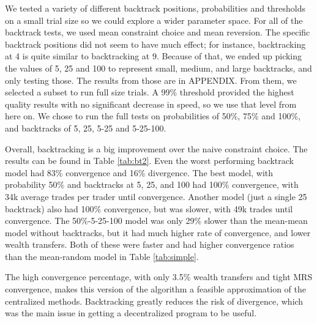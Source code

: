 \documentclass[12pt,a4paper,titlepage]{article}
\begin{document}
We tested a variety of different backtrack positions, probabilities and thresholds on a small trial size so we could explore a wider parameter space.
For all of the backtrack tests, we used mean constraint choice and mean reversion.
The specific backtrack positions did not seem to have much effect; for instance, backtracking at 4 is quite similar to backtracking at 9. 
Because of that, we ended up picking the values of 5, 25 and 100 to represent small, medium, and large backtracks, and only testing those.
The results from those are in APPENDIX.
From them, we selected a subset to run full size trials.
A 99\% threshold provided the highest quality results with no significant decrease in speed, so we use that level from here on.
We chose to run the full tests on probabilities of 50\%, 75\% and 100\%, and backtracks of 5, 25, 5-25 and 5-25-100. 

Overall, backtracking is a big improvement over the naive constraint choice.
The results can be found in Table \ref{tab:bt2}.
Even the worst performing backtrack model had 83\% convergence and 16\% divergence.
The best model, with probability 50\% and backtracks at 5, 25, and 100 had 100\% convergence, with 34k average trades per trader until convergence.
Another model (just a single 25 backtrack) also had 100\% convergence, but was slower, with 49k trades until convergence.
The 50\%-5-25-100 model was only 29\% slower than the mean-mean model without backtracks, but it had much higher rate of convergence, and lower wealth transfers.
Both of these were faster and had higher convergence ratios than the mean-random model in Table \ref{tab:simple}.

The high convergence percentage, with only 3.5\% wealth transfers and tight MRS convergence, makes this version of the algorithm a feasible approximation of the centralized methods. 
Backtracking greatly reduces the risk of divergence, which was the main issue in getting a decentralized program to be useful.
\end{document}
